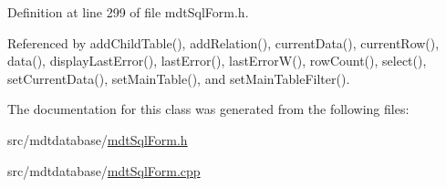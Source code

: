 Definition at line 299 of file mdt\-Sql\-Form.\-h.



Referenced by add\-Child\-Table(), add\-Relation(), current\-Data(), current\-Row(), data(), display\-Last\-Error(), last\-Error(), last\-Error\-W(), row\-Count(), select(), set\-Current\-Data(), set\-Main\-Table(), and set\-Main\-Table\-Filter().



The documentation for this class was generated from the following files\-:\begin{DoxyCompactItemize}
\item 
src/mdtdatabase/\hyperlink{mdt_sql_form_8h}{mdt\-Sql\-Form.\-h}\item 
src/mdtdatabase/\hyperlink{mdt_sql_form_8cpp}{mdt\-Sql\-Form.\-cpp}\end{DoxyCompactItemize}
